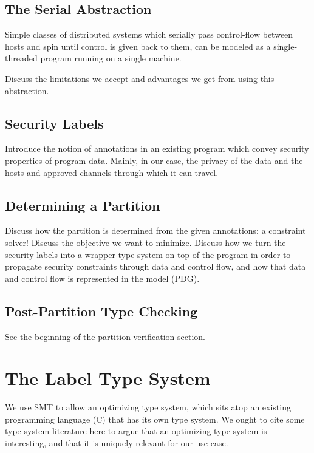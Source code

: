 \documentclass[conference,compsoc]{IEEEtran}
\begin{document}
    \subsection{The Serial Abstraction}

        Simple classes of distributed systems which serially pass control-flow
        between hosts and spin until control is given back to them, can be
        modeled as a single-threaded program running on a single machine.

        Discuss the limitations we accept and advantages we get from using this
        abstraction.

    \subsection{Security Labels}

        Introduce the notion of annotations in an existing program which convey
        security properties of program data. Mainly, in our case, the privacy of
        the data and the hosts and approved channels through which it can
        travel.

    \subsection{Determining a Partition}

        Discuss how the partition is determined from the given annotations:
        a constraint solver! Discuss the objective we want to minimize. Discuss
        how we turn the security labels into a wrapper type system on top of
        the program in order to propagate security constraints through data and
        control flow, and how that data and control flow is represented in the
        model (PDG).

    \subsection{Post-Partition Type Checking}

        See the beginning of the partition verification section.

\section{The Label Type System}

    We use SMT to allow an optimizing type system, which sits atop an
    existing programming language (C) that has its own type system. We ought to
    cite some type-system literature here to argue that an optimizing type
    system is interesting, and that it is uniquely relevant for our use case.
\end{document}
